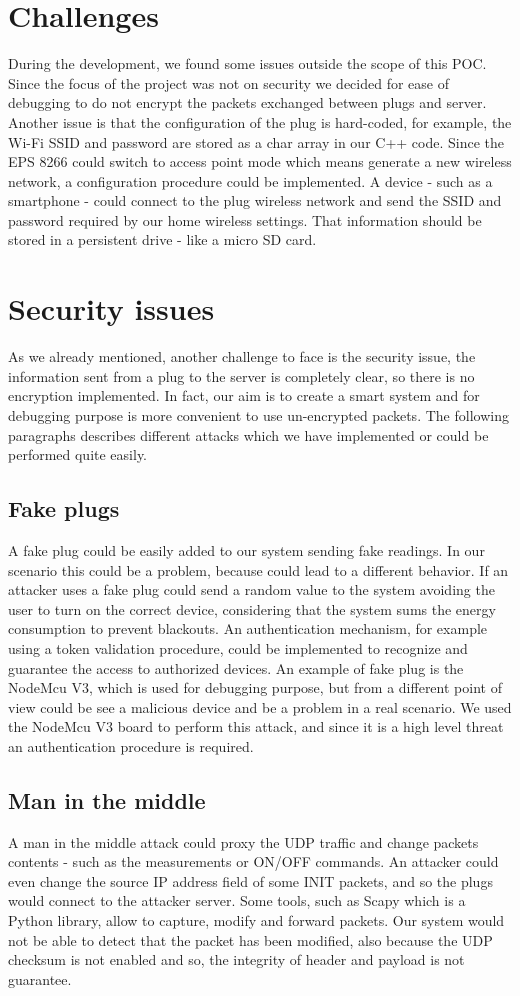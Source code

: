 \documentclass[conference]{IEEEtran}
\begin{document}
	\section{Challenges}
	During the development, we found some issues outside the scope of this POC. Since the focus of the project was not on security we decided for ease of debugging to do not encrypt the packets exchanged between plugs and server. Another issue is that the configuration of the plug is hard-coded, for example, the Wi-Fi SSID and password are stored as a char array in our C++ code. Since the EPS 8266 could switch to access point mode which means generate a new wireless network, a configuration procedure could be implemented. A device - such as a smartphone - could connect to the plug wireless network and send the SSID and password required by our home wireless settings. That information should be stored in a persistent drive - like a micro SD card.
	\section{Security issues}
	As we already mentioned, another challenge to face is the security issue, the information sent from a plug to the server is completely clear, so there is no encryption implemented. 
	In fact, our aim is to create a smart system and for debugging purpose is more convenient to use un-encrypted packets.
	 The following paragraphs describes different attacks which we have implemented or could be performed quite easily.
	\subsection{Fake plugs}
	A fake plug could be easily added to our system sending fake readings. In our scenario this could be a problem, because could lead to a different behavior.
	If an attacker uses a fake plug could send a random value to the system avoiding the user to turn on the correct device, considering that the system sums the energy consumption to prevent blackouts. An authentication mechanism, for example using a token validation procedure, could be implemented to recognize and guarantee the access to authorized devices. An example of fake plug is the NodeMcu V3, which is used for debugging purpose, but from a different point of view could be see a malicious device and be a problem in a real scenario. We used the NodeMcu V3 board to perform this attack, and since it is a high level threat an authentication procedure is required.
	\subsection{Man in the middle}
	A man in the middle attack could proxy the UDP traffic and change packets contents - such as the measurements or ON/OFF commands. 
	An attacker could even change the source IP address field of some INIT packets, and so the plugs would connect to the attacker server.
	Some tools, such as Scapy which is a Python library, allow to capture, modify and forward packets. Our system would not be able to detect that the packet has been modified, 
	also because the UDP checksum is not enabled and so, the integrity of header and payload is not guarantee.
	
\end{document}
